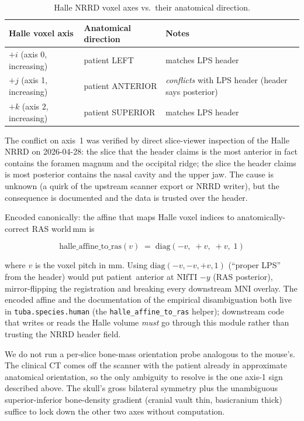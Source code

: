 \documentclass{compactarticle}
\begin{document}
\begin{table}[H]
\centering
\caption{Halle NRRD voxel axes vs.\ their anatomical
direction.}\label{tab:halle_axes}
\begin{tabular}{lll}
\toprule
Halle voxel axis & Anatomical direction & Notes \\
\midrule
$+i$ (axis 0, increasing) & patient LEFT     & matches LPS header \\
$+j$ (axis 1, increasing) & patient ANTERIOR & {\em conflicts} with LPS header (header says posterior) \\
$+k$ (axis 2, increasing) & patient SUPERIOR & matches LPS header \\
\bottomrule
\end{tabular}
\end{table}

The conflict on axis~1 was verified by direct slice-viewer inspection of
the Halle NRRD on 2026-04-28: the slice that the header claims is the
most anterior in fact contains the foramen magnum and the occipital
ridge; the slice the header claims is most posterior contains the
nasal cavity and the upper jaw. The cause is unknown (a quirk of the
upstream scanner export or NRRD writer), but the consequence is
documented and the data is trusted over the header.

Encoded canonically: the affine that maps Halle voxel indices to
anatomically-correct RAS world\,mm is

\begin{equation}
\mathrm{halle\_affine\_to\_ras}(v) \;=\; \mathrm{diag}(-v,\; +v,\; +v,\; 1)
\label{eq:halle_affine}
\end{equation}

where $v$ is the voxel pitch in mm. Using $\mathrm{diag}(-v,-v,+v,1)$
(``proper LPS'' from the header) would put patient~anterior at NIfTI
$-y$ (RAS posterior), mirror-flipping the registration and breaking
every downstream MNI overlay. The encoded affine and the documentation
of the empirical disambiguation both live in
\texttt{tuba.species.human} (the \texttt{halle\_affine\_to\_ras} helper);
downstream code that writes or reads the Halle volume {\em must} go
through this module rather than trusting the NRRD header field.

We do not run a per-slice bone-mass orientation probe analogous to the
mouse's. The clinical CT comes off the scanner with the patient already
in approximate anatomical orientation, so the only ambiguity to resolve
is the one axis-1 sign described above. The skull's gross bilateral
symmetry plus the unambiguous superior-inferior bone-density gradient
(cranial vault thin, basicranium thick) suffice to lock down the other
two axes without computation.
\end{document}
